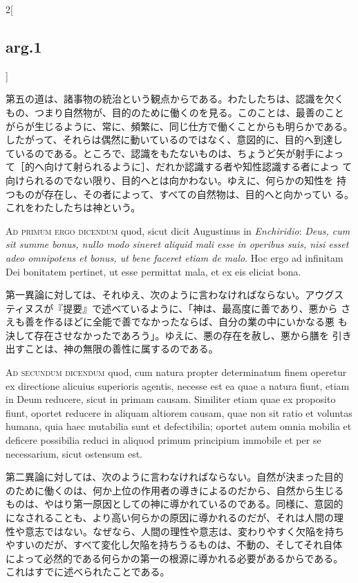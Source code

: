 \documentclass[paper=a4paper,fontsize=10pt,jafontsize=9pt,titlepage]{jlreq}
\begin{document}
\begin{paracol}{2}[\subsection{arg.1}]
\switchcolumn

第五の道は、諸事物の統治という観点からである。わたしたちは、認識を欠く
もの、つまり自然物が、目的のために働くのを見る。このことは、最善のこと
がらが生じるように、常に、頻繁に、同じ仕方で働くことからも明らかである。
したがって、それらは偶然に動いているのではなく、意図的に、目的へ到達し
ているのである。ところで、認識をもたないものは、ちょうど矢が射手によっ
て［的へ向けて射られるように］、だれか認識する者や知性認識する者によっ
て向けられるのでない限り、目的へとは向かわない。ゆえに、何らかの知性を
持つものが存在し、その者によって、すべての自然物は、目的へと向かってい
る。これをわたしたちは神という。

\switchcolumn*[\subsection{ad.1}]

{\scshape Ad primum ergo dicendum} quod, sicut dicit Augustinus in {\itshape
Enchiridio}: {\itshape Deus, cum sit summe bonus, nullo modo sineret
aliquid mali esse in operibus suis, nisi esset adeo omnipotens et
bonus, ut bene faceret etiam de malo}. Hoc ergo ad infinitam Dei
bonitatem pertinet, ut esse permittat mala, et ex eis eliciat bona.

\switchcolumn

第一異論に対しては、それゆえ、次のように言わなければならない。アウグス
ティヌスが『提要』で述べているように、「神は、最高度に善であり、悪から
さえも善を作るほどに全能で善でなかったならば、自分の業の中にいかなる悪
も決して存在させなかったであろう」。ゆえに、悪の存在を赦し、悪から膳を
引き出すことは、神の無限の善性に属するのである。

\switchcolumn*[\subsection{ad.2}]

{\scshape Ad secundum dicendum} quod, cum natura propter determinatum finem
operetur ex directione alicuius superioris agentis, necesse est ea
quae a natura fiunt, etiam in Deum reducere, sicut in primam
causam. Similiter etiam quae ex proposito fiunt, oportet reducere in
aliquam altiorem causam, quae non sit ratio et voluntas humana, quia
haec mutabilia sunt et defectibilia; oportet autem omnia mobilia et
deficere possibilia reduci in aliquod primum principium immobile et
per se necessarium, sicut ostensum est.

\switchcolumn

第二異論に対しては、次のように言わなければならない。自然が決まった目的
のために働くのは、何か上位の作用者の導きによるのだから、自然から生じる
ものは、やはり第一原因としての神に導かれているのである。同様に、意図的
になされることも、より高い何らかの原因に導かれるのだが、それは人間の理
性や意志ではない。なぜなら、人間の理性や意志は、変わりやすく欠陥を持ち
やすいのだが、すべて変化し欠陥を持ちうるものは、不動の、そしてそれ自体
によって必然的である何らかの第一の根源に導かれる必要があるからである。
これはすでに述べられたことである。

\end{paracol}
\end{document}
